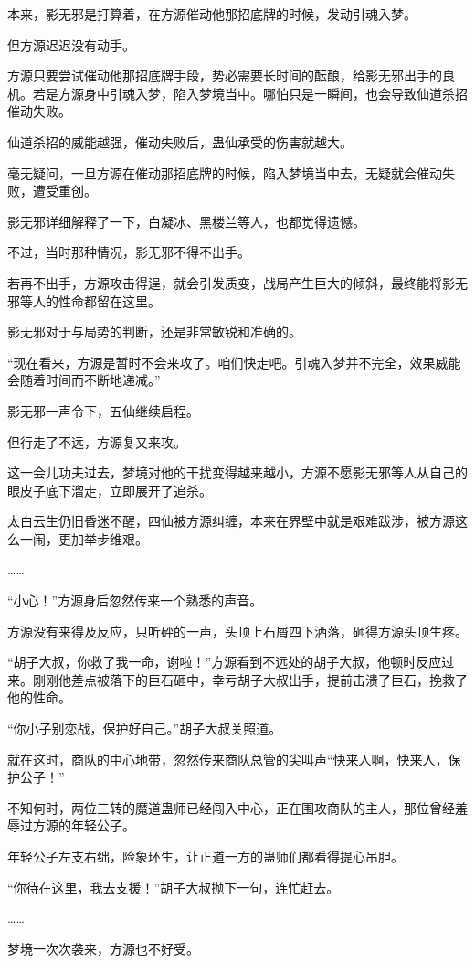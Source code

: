 \begin{this_body}
本来，影无邪是打算着，在方源催动他那招底牌的时候，发动引魂入梦。

但方源迟迟没有动手。

方源只要尝试催动他那招底牌手段，势必需要长时间的酝酿，给影无邪出手的良机。若是方源身中引魂入梦，陷入梦境当中。哪怕只是一瞬间，也会导致仙道杀招催动失败。

仙道杀招的威能越强，催动失败后，蛊仙承受的伤害就越大。

毫无疑问，一旦方源在催动那招底牌的时候，陷入梦境当中去，无疑就会催动失败，遭受重创。

影无邪详细解释了一下，白凝冰、黑楼兰等人，也都觉得遗憾。

不过，当时那种情况，影无邪不得不出手。

若再不出手，方源攻击得逞，就会引发质变，战局产生巨大的倾斜，最终能将影无邪等人的性命都留在这里。

影无邪对于与局势的判断，还是非常敏锐和准确的。

“现在看来，方源是暂时不会来攻了。咱们快走吧。引魂入梦并不完全，效果威能会随着时间而不断地递减。”

影无邪一声令下，五仙继续启程。

但行走了不远，方源复又来攻。

这一会儿功夫过去，梦境对他的干扰变得越来越小，方源不愿影无邪等人从自己的眼皮子底下溜走，立即展开了追杀。

太白云生仍旧昏迷不醒，四仙被方源纠缠，本来在界壁中就是艰难跋涉，被方源这么一闹，更加举步维艰。

……

“小心！”方源身后忽然传来一个熟悉的声音。

方源没有来得及反应，只听砰的一声，头顶上石屑四下洒落，砸得方源头顶生疼。

“胡子大叔，你救了我一命，谢啦！”方源看到不远处的胡子大叔，他顿时反应过来。刚刚他差点被落下的巨石砸中，幸亏胡子大叔出手，提前击溃了巨石，挽救了他的性命。

“你小子别恋战，保护好自己。”胡子大叔关照道。

就在这时，商队的中心地带，忽然传来商队总管的尖叫声“快来人啊，快来人，保护公子！”

不知何时，两位三转的魔道蛊师已经闯入中心，正在围攻商队的主人，那位曾经羞辱过方源的年轻公子。

年轻公子左支右绌，险象环生，让正道一方的蛊师们都看得提心吊胆。

“你待在这里，我去支援！”胡子大叔抛下一句，连忙赶去。

……

梦境一次次袭来，方源也不好受。


\end{this_body}
